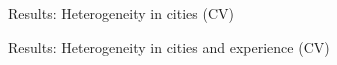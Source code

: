 \documentclass[11pt, aspectratio=169]{beamer}
\begin{document}
\begin{frame}{Results: Heterogeneity in cities (CV)}
    \centering
\end{frame}

\begin{frame}{Results: Heterogeneity in cities and experience (CV)}
    \centering
\end{frame}
\end{document}
